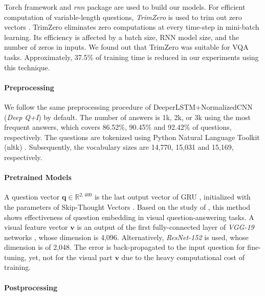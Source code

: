 \documentclass{article}
\newcommand{\vv}[0]{\mathbf{v}}
\newcommand{\vq}[0]{\mathbf{q}}
\begin{document}
Torch framework and \textit{rnn} package \cite{Leonard2015a} are used to build our models. For efficient computation of variable-length questions, \textit{TrimZero} is used to trim out zero vectors \cite{Kim2016a}. TrimZero eliminates zero computations at every time-step in mini-batch learning. Its efficiency is affected by a batch size, RNN model size, and the number of zeros in inputs. We found out that TrimZero was suitable for VQA tasks. Approximately, 37.5\% of training time is reduced in our experiments using this technique.

\paragraph{Preprocessing} We follow the same preprocessing procedure of DeeperLSTM+NormalizedCNN \cite{Lu2015} (\textit{Deep Q+I}) by default. The number of answers is 1k, 2k, or 3k using the most frequent answers, which covers 86.52\%, 90.45\% and 92.42\% of questions, respectively. The questions are tokenized using Python Natural Language Toolkit (nltk) \cite{Bird2009}. Subsequently, the vocabulary sizes are 14,770, 15,031 and 15,169, respectively.


\paragraph{Pretrained Models}

A question vector $\vq \in \mathbb{R}^{2,400}$ is the last output vector of GRU \cite{Cho2014}, initialized with the parameters of Skip-Thought Vectors \cite{Kiros2015}. Based on the study of \citet{Noh2015}, this method shows effectiveness of question embedding in visual question-answering tasks. A visual feature vector $\vv$ is an output of the first fully-connected layer of \textit{VGG-19} networks \cite{Simonyan2015}, whose dimension is 4,096. Alternatively, \textit{ResNet-152} \cite{He2015} is used, whose dimension is of 2,048. The error is back-propagated to the input question for fine-tuning, yet, not for the visual part $\vv$ due to the heavy computational cost of training.

\paragraph{Postprocessing}
\end{document}
